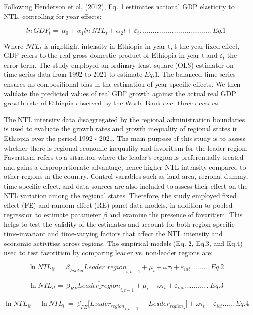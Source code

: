 Following Henderson et al. (2012), Eq. 1 estimates national GDP
elasticity to NTL, controlling for year effects:

\[ln\ {GDP}_{t} = \ \alpha_{0} + \alpha_{1}{ln\ NTL}_{t} + \alpha_{2}t + \varepsilon_{t}\ldots\ldots\ldots\ldots\ldots\ldots\ldots\ldots\ldots\ldots\ldots\ldots..\ Eq.1\]

Where \({NTL}_{t}\) is nightlight intensity in Ethiopia in year t, t the
year fixed effect, GDP refers to the real gross domestic product of
Ethiopia in year t and \(\varepsilon_{t}\) the error term. The study
employed an ordinary least square (OLS) estimator on time series data
from 1992 to 2021 to estimate \(Eq.1\). The balanced time series ensures
no compositional bias in the estimation of year-specific effects. We
then validate the predicted values of real GDP growth against the actual
real GDP growth rate of Ethiopia observed by the World Bank over three
decades.

The NTL intensity data disaggregated by the regional administration
boundaries is used to evaluate the growth rates and growth inequality of
regional states in Ethiopia over the period 1992 - 2021. The main
purpose of this study is to assess whether there is regional economic
inequality and favoritism for the leader region. Favoritism refers to a
situation where the leader's region is preferentially treated and gains
a disproportionate advantage, hence higher NTL intensity compared to
other regions in the country. Control variables such as land area,
regional dummy, time-specific effect, and data sources are also included
to assess their effect on the NTL variation among the regional states.
Therefore, the study employed fixed effect (FE) and random effect (RE)
panel data models, in addition to pooled regression to estimate
parameter \(\beta\) and examine the presence of favoritism. This helps
to test the validity of the estimates and account for both
region-specific time-invariant and time-varying factors that affect the
NTL intensity and economic activities across regions. The empirical
models (Eq. 2, Eq.3, and Eq.4) used to test favoritism by comparing
leader vs. non-leader regions are:

\[\ln{NTL}_{it} = \ {\beta_{Pooled}Leader\_ region}_{i,t - 1} + \mu_{i} + \omega\tau_{t} + \varepsilon_{iat}\ldots\ldots\ldots.\ Eq.2\]

\[\ln{NTL}_{it} = \ {\beta_{RE}\overline{Leader\_ region}}_{i,t - 1} + \mu_{i} + \omega\tau_{t} + \varepsilon_{iat}\ldots\ldots\ldots\ldots.\ Eq.3\]

\[\ln{NTL}_{it} - \overline{\ln{NTL}_{i}}\  = \ {\beta_{FE}\lbrack Leader_{region}}_{i,t - 1} - {\ \overline{Leader_{region}}}_{i}\rbrack + \omega\tau_{t} + \varepsilon_{iat}\ldots\ldots\ Eq.4\]

